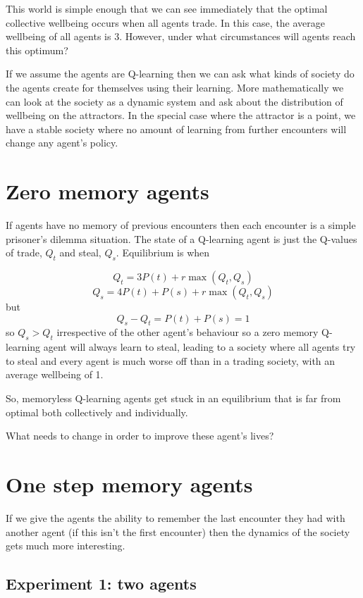 \documentclass[a4paper]{report}
\begin{document}
This world is simple enough that we can see immediately that the optimal collective wellbeing occurs when all agents trade. In this case, the average wellbeing of all agents is 3. However, under what circumstances will agents reach this optimum?

If we assume the agents are Q-learning then we can ask what kinds of society do the agents create for themselves using their learning. More mathematically we can look at the society as a dynamic system and ask about the distribution of wellbeing on the attractors. In the special case where the attractor is a point, we have a stable society where no amount of learning from further encounters will change any agent's policy.

\section{Zero memory agents}

If agents have no memory of previous encounters then each encounter is a simple prisoner's dilemma situation. The state of a Q-learning agent is just the Q-values of trade, $Q_t$ and steal, $Q_s$. Equilibrium is when

\[
Q_t = 3P(t) + r\max(Q_t, Q_s)
\]
\[
Q_s = 4P(t) + P(s) + r\max(Q_t, Q_s)
\]
but
\[
Q_s - Q_t = P(t) + P(s) = 1
\]
so $Q_s > Q_t$ irrespective of the other agent's behaviour so a zero memory Q-learning agent will always learn to steal, leading to a society where all agents try to steal and every agent is much worse off than in a trading society, with an average wellbeing of 1.

So, memoryless Q-learning agents get stuck in an equilibrium that is far from optimal both collectively and individually.

What needs to change in order to improve these agent's lives?

\section{One step memory agents}

If we give the agents the ability to remember the last encounter they had with another agent (if this isn't the first encounter) then the dynamics of the society gets much more interesting.

\subsection{Experiment 1: two agents}
\end{document}
